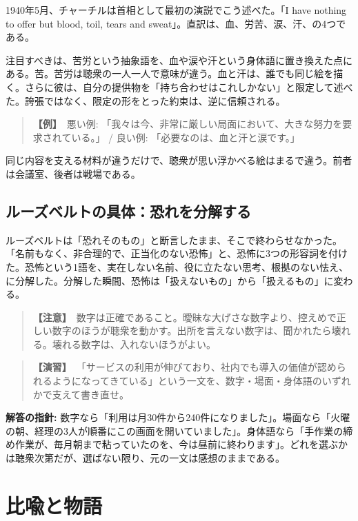 \documentclass{article}
\begin{document}
1940年5月、チャーチルは首相として最初の演説でこう述べた。「I have nothing to offer but blood, toil, tears and sweat」。直訳は、血、労苦、涙、汗、の4つである。

注目すべきは、苦労という抽象語を、血や涙や汗という身体語に置き換えた点にある。苦。苦労は聴衆の一人一人で意味が違う。血と汗は、誰でも同じ絵を描く。さらに彼は、自分の提供物を「持ち合わせはこれしかない」と限定して述べた。誇張ではなく、限定の形をとった約束は、逆に信頼される。

\begin{quote}
\textbf{【例】}\ 悪い例: 「我々は今、非常に厳しい局面において、大きな努力を要求されている。」 / 良い例: 「必要なのは、血と汗と涙です。」
\end{quote}

同じ内容を支える材料が違うだけで、聴衆が思い浮かべる絵はまるで違う。前者は会議室、後者は戦場である。

\subsection{ルーズベルトの具体：恐れを分解する}

ルーズベルトは「恐れそのもの」と断言したまま、そこで終わらせなかった。「名前もなく、非合理的で、正当化のない恐怖」と、恐怖に3つの形容詞を付けた。恐怖という1語を、実在しない名前、役に立たない思考、根拠のない怯え、に分解した。分解した瞬間、恐怖は「扱えないもの」から「扱えるもの」に変わる。

\begin{quote}
\textbf{【注意】}\ 数字は正確であること。曖昧な大げさな数字より、控えめで正しい数字のほうが聴衆を動かす。出所を言えない数字は、聞かれたら壊れる。壊れる数字は、入れないほうがよい。
\end{quote}

\begin{quote}
\textbf{【演習】}\ 「サービスの利用が伸びており、社内でも導入の価値が認められるようになってきている」という一文を、数字・場面・身体語のいずれかで支えて書き直せ。
\end{quote}

\textbf{解答の指針:} 数字なら「利用は月30件から240件になりました」。場面なら「火曜の朝、経理の3人が順番にこの画面を開いていました」。身体語なら「手作業の締め作業が、毎月朝まで粘っていたのを、今は昼前に終わります」。どれを選ぶかは聴衆次第だが、選ばない限り、元の一文は感想のままである。

\section{比喩と物語}
\end{document}
